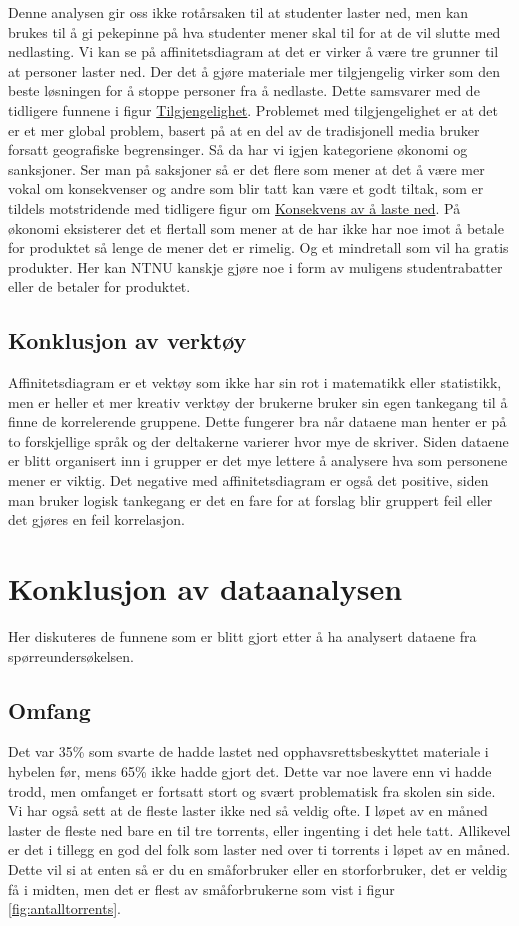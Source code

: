  Denne analysen gir oss ikke rotårsaken til at studenter laster ned, men kan brukes til å gi pekepinne på hva studenter mener skal til for at de vil slutte med nedlasting. Vi kan se på affinitetsdiagram at det er virker å være tre grunner til at personer laster ned. Der det å gjøre materiale mer tilgjengelig virker som den beste løsningen for å stoppe personer fra å nedlaste. Dette samsvarer med de tidligere funnene i figur \hyperref[fig:tilgjengelighet]{Tilgjengelighet}. Problemet med tilgjengelighet er at det er et mer global problem, basert på at en del av de tradisjonell media bruker forsatt geografiske begrensinger. Så da har vi igjen kategoriene økonomi og sanksjoner. Ser man på saksjoner så er det flere som mener at det å være mer vokal om konsekvenser og andre som blir tatt kan være et godt tiltak, som er tildels motstridende med tidligere figur om \hyperref[fig:konsekvens_lasterned]{Konsekvens av å laste ned}. På økonomi eksisterer det et flertall som mener at de har ikke har noe imot å betale for produktet så lenge de mener det er rimelig. Og et mindretall som vil ha gratis produkter. Her kan NTNU kanskje gjøre noe i form av muligens studentrabatter eller de betaler for produktet.          


\subsection{Konklusjon av verktøy}
Affinitetsdiagram er et vektøy som ikke har sin rot i matematikk eller statistikk, men er heller et mer kreativ verktøy der brukerne bruker sin egen tankegang til å finne de korrelerende gruppene. Dette fungerer bra når dataene man henter er på to forskjellige språk og der deltakerne varierer hvor mye de skriver. Siden dataene er blitt organisert inn i grupper er det mye lettere å analysere hva som personene mener er viktig. Det negative med affinitetsdiagram er også det positive, siden man bruker logisk tankegang er det en fare for at forslag blir gruppert feil eller det gjøres en feil korrelasjon.        
  

\section{Konklusjon av dataanalysen}
Her diskuteres de funnene som er blitt gjort etter å ha analysert dataene fra spørreundersøkelsen. 

\subsection{Omfang}
Det var 35\% som svarte de hadde lastet ned opphavsrettsbeskyttet materiale i hybelen før, mens 65\% ikke hadde gjort det. Dette var noe lavere enn vi hadde trodd, men omfanget er fortsatt stort og svært problematisk fra skolen sin side. Vi har også sett at de fleste laster ikke ned så veldig ofte. I løpet av en måned laster de fleste ned bare en til tre torrents, eller ingenting i det hele tatt. Allikevel er det i tillegg en god del folk som laster ned over ti torrents i løpet av en måned. Dette vil si at enten så er du en småforbruker eller en storforbruker, det er veldig få i midten, men det er flest av småforbrukerne som vist i figur \ref{fig:antalltorrents}.

